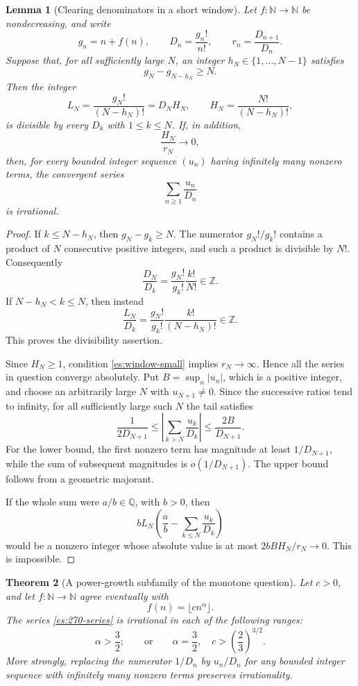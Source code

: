\documentclass[11pt,a4paper]{article}
\numberwithin{equation}{section}
\newtheorem{theorem}{Theorem}[section]
\newtheorem{lemma}[theorem]{Lemma}
\theoremstyle{definition}
\theoremstyle{remark}
\begin{document}
\begin{lemma}[Clearing denominators in a short window]
\label{es:window}
Let $f:\mathbb N\to\mathbb N$ be nondecreasing, and write
\[
 g_n=n+f(n),\qquad D_n=\frac{g_n!}{n!},\qquad
 r_n=\frac{D_{n+1}}{D_n}.
\]
Suppose that, for all sufficiently large $N$, an integer
$h_N\in\{1,\ldots,N-1\}$ satisfies
\begin{equation}\label{es:window-gap}
 g_N-g_{N-h_N}\ge N.
\end{equation}
Then the integer
\[
 L_N=\frac{g_N!}{(N-h_N)!}
     =D_N H_N,\qquad
 H_N=\frac{N!}{(N-h_N)!},
\]
is divisible by every $D_k$ with $1\le k\le N$.
If, in addition,
\begin{equation}\label{es:window-small}
 \frac{H_N}{r_N}\longrightarrow0,
\end{equation}
then, for every bounded integer sequence $(u_n)$ having infinitely
many nonzero terms, the convergent series
\[
 \sum_{n\ge1}\frac{u_n}{D_n}
\]
is irrational.
\end{lemma}

\begin{proof}
If $k\le N-h_N$, then $g_N-g_k\ge N$.  The numerator
$g_N!/g_k!$ contains a product of $N$ consecutive positive integers,
and such a product is divisible by $N!$.  Consequently
\[
 \frac{D_N}{D_k}=\frac{g_N!}{g_k!}\frac{k!}{N!}
 \in\mathbb Z.
\]
If $N-h_N<k\le N$, then instead
\[
 \frac{L_N}{D_k}
   =\frac{g_N!}{g_k!}\frac{k!}{(N-h_N)!}
   \in\mathbb Z.
\]
This proves the divisibility assertion.

Since $H_N\ge1$, condition \eqref{es:window-small} implies
$r_N\to\infty$.  Hence all the series in question converge
absolutely.  Put $B=\sup_n|u_n|$, which is a positive integer, and
choose an arbitrarily large $N$ with $u_{N+1}\ne0$.  Since the
successive ratios tend to infinity, for all sufficiently large such
$N$ the tail satisfies
\[
 \frac{1}{2D_{N+1}}
 \le\left|\sum_{k>N}\frac{u_k}{D_k}\right|
 \le\frac{2B}{D_{N+1}}.
\]
For the lower bound, the first nonzero term has magnitude at least
$1/D_{N+1}$, while the sum of subsequent magnitudes is
$o(1/D_{N+1})$.  The upper bound follows from a geometric majorant.

If the whole sum were $a/b\in\mathbb Q$, with $b>0$, then
\[
 bL_N\left(\frac ab-\sum_{k\le N}\frac{u_k}{D_k}\right)
\]
would be a nonzero integer whose absolute value is at most
$2bB H_N/r_N\to0$.  This is impossible.
\end{proof}

\begin{theorem}[A power-growth subfamily of the monotone question]
\label{es:power270}
Let $c>0$, and let $f:\mathbb N\to\mathbb N$ agree eventually with
\[
 f(n)=\lfloor c n^\alpha\rfloor.
\]
The series \eqref{es:270-series} is irrational in each of the
following ranges:
\begin{equation}\label{es:power-range}
 \alpha>\frac32;
 \qquad\text{or}\qquad
 \alpha=\frac32,\quad c>\left(\frac23\right)^{3/2}.
\end{equation}
More strongly, replacing the numerator $1/D_n$ by $u_n/D_n$ for
any bounded integer sequence with infinitely many nonzero terms
preserves irrationality.
\end{theorem}
\end{document}
